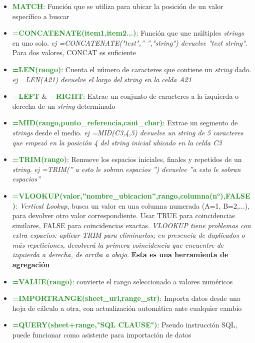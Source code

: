 \begin{itemize}
    \item {\textcolor{ForestGreen}{\textbf{MATCH}}: Función que se utiliza para ubicar la posición de un valor específico a buscar}
    \item {\textcolor{ForestGreen}{\textbf{=CONCATENATE(item1,item2...)}}: Función que une múltiples \textit{strings} en uno solo. \textit{ej =CONCATENATE("text",'' '',"string") devuelve "text string"}. Para dos valores, CONCAT es suficiente}
    \item {\textcolor{ForestGreen}{\textbf{=LEN(rango)}}: Cuenta el número de caracteres que contiene un \textit{string} dado. \textit{ej =LEN(A21) devuelve el largo del string en la celda A21}}
    \item {\textcolor{ForestGreen}{\textbf{=LEFT}} \& \textcolor{ForestGreen}{\textbf{=RIGHT}}: Extrae un conjunto de caracteres a la izquierda o derecha de un \textit{string} determinado}
    \item {\textcolor{ForestGreen}{\textbf{=MID(rango,punto\_referencia,cant\_char)}}: Extrae un segmento de \textit{strings} desde el medio. \textit{ej =MID(C3,4,5) devuelve un string de 5 caracteres que empezó en la posición 4 del string inicial ubicado en la celda C3}}
    \item {\textcolor{ForestGreen}{\textbf{=TRIM(rango)}}: Remueve los espacios iniciales, finales y repetidos de un \textit{string}. \textit{ej =TRIM('' a esto le sobran espacios  '') devuelve ''a esto le sobran espacios''}}
    \item {\textcolor{ForestGreen}{\textbf{=VLOOKUP(valor,''nombre\_ubicacion'',rango,columna(n°),FALSE)}}: \textit{Vertical Lookup}, busca un valor en una columna numerada (A=1, B=2,...), para devolver otro valor correspondiente. Usar TRUE para coincidencias similares, FALSE para coincidencias exactas. \textit{VLOOKUP tiene problemas con extra espacios: aplicar TRIM para eliminarlos; en presencia de duplicados o más repeticiones, devolverá la primera coincidencia que encuentre de izquierda a derecha, de arriba a abajo}. \textbf{Esta es una herramienta de agregación}}
    \item {\textcolor{ForestGreen}{\textbf{=VALUE(rango)}}: convierte el rango seleccionado a valores numéricos}
    \item {\textcolor{ForestGreen}{\textbf{=IMPORTRANGE(sheet\_url,range\_str)}}: Importa datos desde una hoja de cálculo a otra, con actualización automática ante cualquier cambio}
    \item {\textcolor{ForestGreen}{\textbf{=QUERY(sheet+range,"SQL CLAUSE")}}: Pseudo instrucción SQL, puede funcionar como asistente para importación de datos}

\end{itemize}
